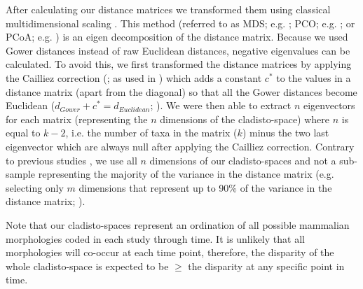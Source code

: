 \documentclass[12pt,letterpaper]{article}
\renewcommand{\subsubsection}[1]{%
\vspace{2ex}
\noindent
\textit{#1.}---}
\begin{document}
After calculating our distance matrices we transformed them using classical multidimensional scaling \citep[MDS;][]{torgerson1965multidimensional,GOWER01121966,cailliez1983analytical}.
This method (referred to as MDS; e.g. \citealt{DonohueDim}; PCO; e.g. \citealt{Brusatte2015}; or PCoA; e.g. \citealt{paradisape:2004}) is an eigen decomposition of the distance matrix.
Because we used Gower distances instead of raw Euclidean distances, negative eigenvalues can be calculated.
To avoid this, we first transformed the distance matrices by applying the Cailliez correction (\citealt{cailliez1983analytical}; as used in \citealt{toljagictriassic-jurassic2013}) which adds a constant $c^*$ to the values in a distance matrix (apart from the diagonal) so that all the Gower distances become Euclidean ($d_{Gower}+c^*=d_{Euclidean}$; \citealt{cailliez1983analytical}). 
We were then able to extract $n$ eigenvectors for each matrix (representing the $n$ dimensions of the cladisto-space) where $n$ is equal to $k-2$, i.e. the number of taxa in the matrix ($k$) minus the two last eigenvector which are always null after applying the Cailliez correction.
Contrary to previous studies \citep[e.g][]{brusatte50,cisneros2010,prentice2011,anderson2012using,Hughes20082013,bentonmodels2014}, we use all $n$ dimensions of our cladisto-spaces and not a sub-sample representing the majority of the variance in the distance matrix (e.g. selecting only $m$ dimensions that represent up to 90\% of the variance in the distance matrix; \citealt{Brusatte12092008,toljagictriassic-jurassic2013}).

Note that our cladisto-spaces represent an ordination of all possible mammalian morphologies coded in each study through time.
It is unlikely that all morphologies will co-occur at each time point, therefore, the disparity of the whole cladisto-space is expected to be $\geq$ the disparity at any specific point in time.
\end{document}
